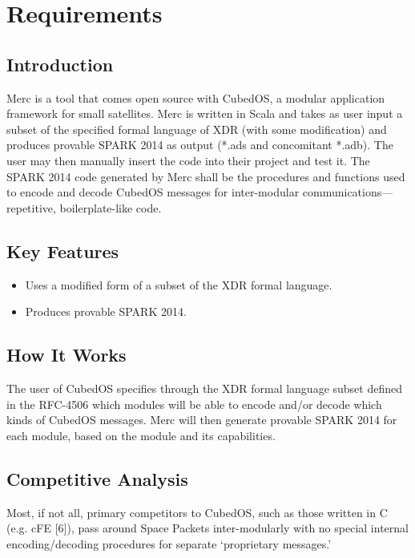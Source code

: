 \chapter{Requirements}
\label{chapt-requirements}

\section{Introduction}

Merc is a tool that comes open source with CubedOS, a modular application framework for small
satellites. Merc is written in Scala and takes as user input a subset of the specified formal
language of XDR (with some modification) and produces provable SPARK 2014 as output (*.ads and
concomitant *.adb). The user may then manually insert the code into their project and test it.
The SPARK 2014 code generated by Merc shall be the procedures and functions used to encode
and decode CubedOS messages for inter-modular communications—repetitive, boilerplate-like code.

\section{Key Features}

\begin{itemize}
\item Uses a modified form of a subset of the XDR formal language.
\item Produces provable SPARK 2014.
\end{itemize}

\section{How It Works}

The user of CubedOS specifies through the XDR formal language subset defined in the RFC-4506
which modules will be able to encode and/or decode which kinds of CubedOS messages. Merc will
then generate provable SPARK 2014 for each module, based on the module and its capabilities.

\section{Competitive Analysis}

Most, if not all, primary competitors to CubedOS, such as those written in C (e.g. cFE [6]),
pass around Space Packets inter-modularly with no special internal encoding/decoding procedures
for separate ‘proprietary messages.’

